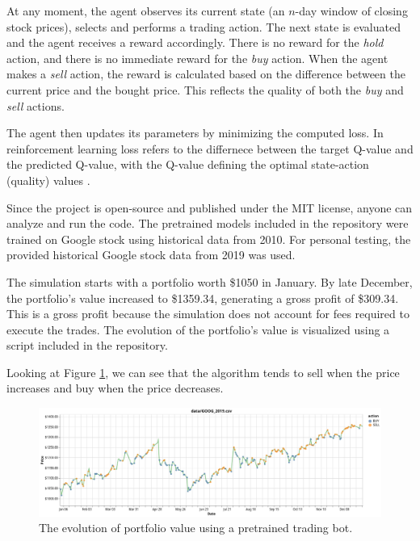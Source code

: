 \documentclass[a4paper,oneside,onecolumn,12pt]{book}
\begin{document}
	At any moment, the agent observes its current state (an $n$-day window of closing stock prices), selects and performs a trading action. The next state is evaluated and the agent receives a reward accordingly. There is no reward for the \textit{hold} action, and there is no immediate reward for the \textit{buy} action. When the agent makes a \textit{sell} action, the reward is calculated based on the difference between the current price and the bought price. This reflects the quality of both the \textit{buy} and \textit{sell} actions.

	The agent then updates its parameters by minimizing the computed loss. In reinforcement learning loss refers to the differnece between the target Q-value and the predicted Q-value, with the Q-value defining the optimal state-action (quality) values \cite{HMLSKT}.

	Since the project is open-source and published under the MIT license, anyone can analyze and run the code. The pretrained models included in the repository were trained on Google stock using historical data from 2010. For personal testing, the provided historical Google stock data from 2019 was used.

	The simulation starts with a portfolio worth \$1050 in January. By late December, the portfolio's value increased to \$1359.34, generating a gross profit of \$309.34. This is a gross profit because the simulation does not account for fees required to execute the trades. The evolution of the portfolio's value is visualized using a script included in the repository.

	Looking at Figure \ref{fig:STBRL portfolio evolution}, we can see that the algorithm tends to sell when the price increases and buy when the price decreases.
	\begin{figure}[H]
	\begin{center}
		\includegraphics[width=\linewidth]{kep/trade_bot_visualization.png}
		\caption{The evolution of portfolio value using a pretrained trading bot.}
		\label{fig:STBRL portfolio evolution}
	\end{center}
	\end{figure}
\end{document}

